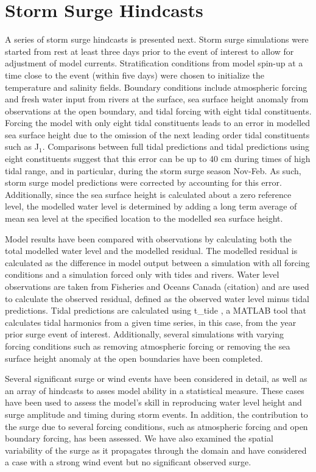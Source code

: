 \documentclass[pdftex,10pt]{article}
\begin{document}
\section{Storm Surge Hindcasts}\label{sec:storm}
A series of storm surge hindcasts is presented next. Storm surge simulations were started from rest at least three days prior to the event of interest to allow for adjustment of model currents. Stratification conditions from model spin-up at a time close to the event (within five days) were chosen to initialize the temperature and salinity fields. Boundary conditions include atmospheric forcing and fresh water input from rivers at the surface, sea surface height anomaly from observations at the open boundary, and tidal forcing with eight tidal constituents. Forcing the model with only eight tidal constituents leads to an error in modelled sea surface height due to the omission of the next leading order tidal constituents such as J$_1$. Comparisons between full tidal predictions and tidal predictions using eight constituents suggest that this error can be up to 40 cm during times of high tidal range, and in particular, during the storm surge season Nov-Feb. As such, storm surge model predictions were corrected by accounting for this error. Additionally, since the sea surface height is calculated about a zero reference level, the modelled water level is determined by adding a long term average of mean sea level at the specified location to the modelled sea surface height.

Model results have been compared with observations by calculating both the total modelled water level and the modelled residual. The modelled residual is calculated as the difference in model output between a simulation with all forcing conditions and a simulation forced only with tides and rivers. Water level observations are taken from Fisheries and Oceans Canada (citation) and are used to calculate the observed residual, defined as the observed water level minus tidal predictions. Tidal predictions are calculated using t\_tide \citep{pawlowicz2002classical}, a MATLAB tool that calculates tidal harmonics from a given time series, in this case, from the year prior surge event of interest. Additionally, several simulations with varying forcing conditions such as removing atmospheric forcing or removing the sea surface height anomaly at the open boundaries have been completed. 

Several significant surge or wind events have been considered in detail, as well as an array of hindcasts to asses model ability in a statistical measure. These cases have been used to assess the model's skill in reproducing water level height and surge amplitude and timing during storm events. In addition, the contribution to the surge due to several forcing conditions, such as atmospheric forcing and open boundary forcing, has been assessed. We have also examined the spatial variability of the surge as it propagates through the domain and have considered a case with a strong wind event but no significant observed surge.  
\end{document}
